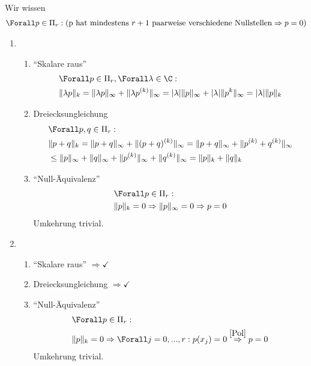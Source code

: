 \begin{solution}
Wir wissen
\begin{align}\label{Pol}
  \Forall p \in \Pi_r :(\text{p hat mindestens $r+1$ paarweise verschiedene Nullstellen} \Rightarrow p = 0)
\end{align}
\begin{enumerate}[label = \textbf{\alph*)}]
  \item
  \begin{enumerate}[label = \textit{\roman*)}]
    \item \enquote{Skalare raus} \begin{align*}
      & \Forall p \in \Pi_r, \Forall \lambda \in \C: \\
      & \|\lambda p\|_k = \|\lambda p\|_\infty + \|\lambda p^{(k)}\|_\infty = |\lambda| \|p\|_\infty + |\lambda| \|p^{k}\|_\infty = |\lambda| \|p\|_k
    \end{align*}
    \item Dreiecksungleichung \begin{align*}
      &\Forall p,q \in \Pi_r: \\
      & \|p+q\|_k = \|p+q\|_\infty + \|(p+q)^{(k)}\|_\infty = \|p+q\|_\infty + \|p^{(k)}+q^{(k)}\|_\infty\\
      &\leq \|p\|_\infty + \|q\|_\infty + \|p^{(k)}\|_\infty + \|q^{(k)}\|_\infty = \|p\|_k + \|q\|_k
    \end{align*}
    \item \enquote{Null-Äquivalenz} \begin{align*}
      &\Forall p \in \Pi_r: \\
      & \|p\|_k = 0 \Rightarrow \|p\|_\infty = 0 \Rightarrow p = 0
    \end{align*}
    Umkehrung trivial.
  \end{enumerate}
  \item
  \begin{enumerate}[label = \textit{\roman*)}]
    \item \enquote{Skalare raus} $\Rightarrow \checkmark$
    \item Dreiecksungleichung $\Rightarrow \checkmark$
    \item \enquote{Null-Äquivalenz} \begin{align*}
      &\Forall p \in \Pi_r: \\
      & \|p\|_k = 0 \Rightarrow \Forall j=0,...,r: p(x_j) = 0 \stackrel{\eqref{Pol}}{\Rightarrow} p = 0
    \end{align*}
    Umkehrung trivial.
  \end{enumerate}

\end{enumerate}
\end{solution}
